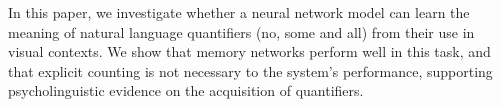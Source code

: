 In this paper, we investigate whether a neural network model can learn the meaning of natural language quantifiers (no, some and all) from their use in visual contexts. We show that memory networks perform well in this task, and that explicit counting is not necessary to the system's performance, supporting psycholinguistic evidence on the acquisition of quantifiers.
